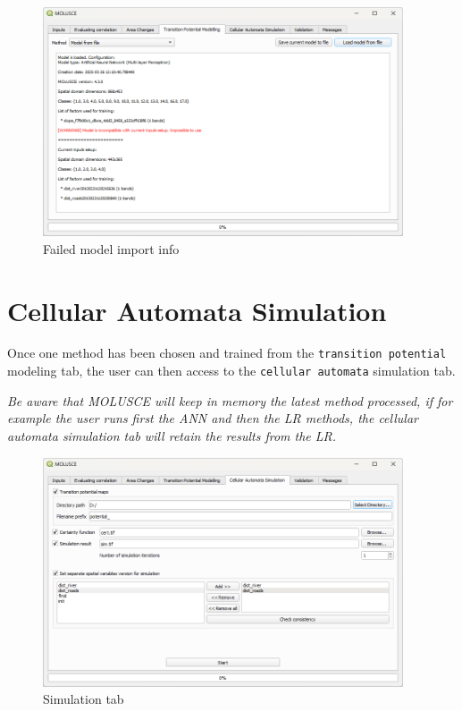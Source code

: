 \documentclass{report}
\begin{document}
\begin{figure}[ht!]
	\centering
	\includegraphics[width=0.95\textwidth]{img/loaded_model_fail.png}
	\caption{Failed model import info}
	\label{fig:loaded_model_fail}
\end{figure}

\section{Cellular Automata Simulation}

Once one method has been chosen and trained from the \verb+transition potential+ modeling tab, 
the user can then access to the \verb+cellular automata+ simulation tab.

\emph{Be aware that MOLUSCE will keep in memory the
latest method processed, if for example the user runs first the ANN and then the LR methods, the
cellular automata simulation tab will retain the results from the LR.}


\begin{figure}[h!]
\centering
\includegraphics[width=0.95\textwidth]{img/simulation_tab.png}
\caption{Simulation tab}
\label{fig:simulation_tab}
\end{figure}
\end{document}
